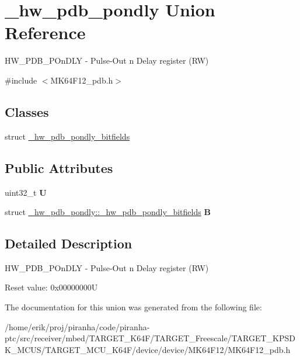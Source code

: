\hypertarget{union__hw__pdb__pondly}{}\section{\+\_\+hw\+\_\+pdb\+\_\+pondly Union Reference}
\label{union__hw__pdb__pondly}


H\+W\+\_\+\+P\+D\+B\+\_\+\+P\+On\+D\+LY -\/ Pulse-\/\+Out n Delay register (RW)  




{\ttfamily \#include $<$M\+K64\+F12\+\_\+pdb.\+h$>$}

\subsection*{Classes}
\begin{DoxyCompactItemize}
\item 
struct \hyperlink{struct__hw__pdb__pondly_1_1__hw__pdb__pondly__bitfields}{\+\_\+hw\+\_\+pdb\+\_\+pondly\+\_\+bitfields}
\end{DoxyCompactItemize}
\subsection*{Public Attributes}
\begin{DoxyCompactItemize}
\item 
uint32\+\_\+t {\bfseries U}\hypertarget{union__hw__pdb__pondly_a155f812113d9d50ce481fe9ba440f5f1}{}\label{union__hw__pdb__pondly_a155f812113d9d50ce481fe9ba440f5f1}

\item 
struct \hyperlink{struct__hw__pdb__pondly_1_1__hw__pdb__pondly__bitfields}{\+\_\+hw\+\_\+pdb\+\_\+pondly\+::\+\_\+hw\+\_\+pdb\+\_\+pondly\+\_\+bitfields} {\bfseries B}\hypertarget{union__hw__pdb__pondly_a8fc79dfa44ee8c9798196cc3ba2d4e7d}{}\label{union__hw__pdb__pondly_a8fc79dfa44ee8c9798196cc3ba2d4e7d}

\end{DoxyCompactItemize}


\subsection{Detailed Description}
H\+W\+\_\+\+P\+D\+B\+\_\+\+P\+On\+D\+LY -\/ Pulse-\/\+Out n Delay register (RW) 

Reset value\+: 0x00000000U 

The documentation for this union was generated from the following file\+:\begin{DoxyCompactItemize}
\item 
/home/erik/proj/piranha/code/piranha-\/ptc/src/receiver/mbed/\+T\+A\+R\+G\+E\+T\+\_\+\+K64\+F/\+T\+A\+R\+G\+E\+T\+\_\+\+Freescale/\+T\+A\+R\+G\+E\+T\+\_\+\+K\+P\+S\+D\+K\+\_\+\+M\+C\+U\+S/\+T\+A\+R\+G\+E\+T\+\_\+\+M\+C\+U\+\_\+\+K64\+F/device/device/\+M\+K64\+F12/M\+K64\+F12\+\_\+pdb.\+h\end{DoxyCompactItemize}

